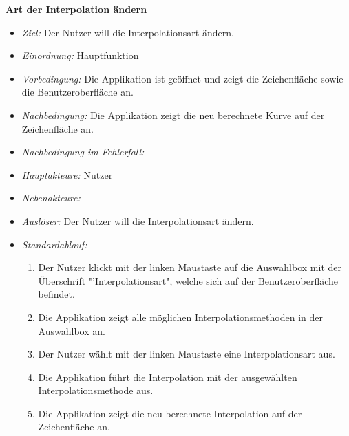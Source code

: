 \textbf{Art der Interpolation \"andern}
  \begin{itemize}
  \item \textit{Ziel:} Der Nutzer will die Interpolationsart \"andern.
  \item \textit{Einordnung:} Hauptfunktion
  \item \textit{Vorbedingung:} Die Applikation ist ge\"offnet und zeigt die Zeichenfl\"ache sowie die Benutzeroberfl\"ache an.
  \item \textit{Nachbedingung:} Die Applikation zeigt die neu berechnete Kurve auf der Zeichenfl\"ache an.
  \item \textit{Nachbedingung im Fehlerfall:} 
  \item \textit{Hauptakteure:} Nutzer
  \item \textit{Nebenakteure:} 
  \item \textit{Ausl\"oser:} Der Nutzer will die Interpolationsart \"andern.
  \item \textit{Standardablauf:}
    \begin{enumerate}[label=(\arabic*)]
    \item Der Nutzer klickt mit der linken Maustaste auf die Auswahlbox mit der \"Uberschrift "'Interpolationsart", welche sich auf der Benutzeroberfl\"ache befindet.
    \item Die Applikation zeigt alle m\"oglichen Interpolationsmethoden in der Auswahlbox an.
    \item Der Nutzer w\"ahlt mit der linken Maustaste eine Interpolationsart aus.
    \item Die Applikation f\"uhrt die Interpolation mit der ausgew\"ahlten Interpolationsmethode aus.
    \item Die Applikation zeigt die neu berechnete Interpolation auf der Zeichenfl\"ache an.
    \end{enumerate}
  \end{itemize}